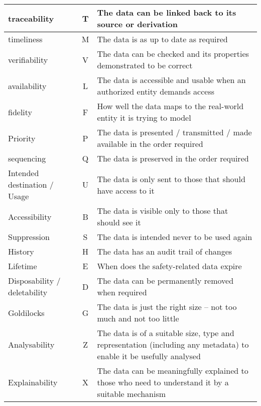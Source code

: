 \begin{longtable}{|L{}|C{}|L{}|}
  {\Gls{traceability}} & T & {The data can be linked back to its source or derivation}\\\hline
  {\Gls{timeliness}} & M & {The data is as up to date as required}\\\hline
  {\Gls{verifiability}} & V & {The data can be checked and its properties demonstrated to be correct}\\\hline
  {\Gls{availability}} & L & {The data is accessible and usable when an authorized entity demands access}\\\hline
  {\Gls{fidelity}} & F & {How well the data maps to the real-world entity it is trying to model}\\\hline
  {Priority} & P & {The data is presented / transmitted / made available in the order required}\\\hline
  {\Gls{sequencing}} & Q & {The data is preserved in the order required}\\\hline
  {Intended destination / Usage} & U & {The data is only sent to those that should have
  access to
  it}\\\hline
  {Accessibility} & B & {The data is visible only to those that should see it}\\\hline
  {Suppression} & S & {The data is intended never to be used again}\\\hline
  {History} & H & {The data has an audit trail of changes}\\\hline
  {Lifetime} & E & {When does the safety-related data expire}\\\hline
  {Disposability / deletability} & D & {The data can be permanently removed when required}\\\hline
  {Goldilocks} & G & {The data is just the right size -- not too much and not too little}\\\hline
  {Analysability} & Z & {The data is of a suitable size, type and representation (including any \gls{metadata}) to enable it be usefully analysed}\\\hline
  {Explainability} & X & {The data can be meaningfully explained to those who need to understand it by a suitable mechanism}\\\hline
\end{longtable}

